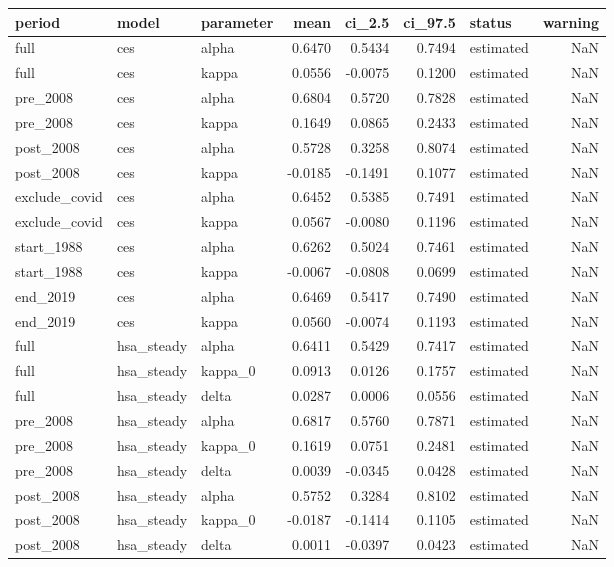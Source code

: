 \begin{tabular}{lllrrrlr}
\toprule
period & model & parameter & mean & ci\_2.5 & ci\_97.5 & status & warning \\
\midrule
full & ces & alpha & 0.6470 & 0.5434 & 0.7494 & estimated & NaN \\
full & ces & kappa & 0.0556 & -0.0075 & 0.1200 & estimated & NaN \\
pre\_2008 & ces & alpha & 0.6804 & 0.5720 & 0.7828 & estimated & NaN \\
pre\_2008 & ces & kappa & 0.1649 & 0.0865 & 0.2433 & estimated & NaN \\
post\_2008 & ces & alpha & 0.5728 & 0.3258 & 0.8074 & estimated & NaN \\
post\_2008 & ces & kappa & -0.0185 & -0.1491 & 0.1077 & estimated & NaN \\
exclude\_covid & ces & alpha & 0.6452 & 0.5385 & 0.7491 & estimated & NaN \\
exclude\_covid & ces & kappa & 0.0567 & -0.0080 & 0.1196 & estimated & NaN \\
start\_1988 & ces & alpha & 0.6262 & 0.5024 & 0.7461 & estimated & NaN \\
start\_1988 & ces & kappa & -0.0067 & -0.0808 & 0.0699 & estimated & NaN \\
end\_2019 & ces & alpha & 0.6469 & 0.5417 & 0.7490 & estimated & NaN \\
end\_2019 & ces & kappa & 0.0560 & -0.0074 & 0.1193 & estimated & NaN \\
full & hsa\_steady & alpha & 0.6411 & 0.5429 & 0.7417 & estimated & NaN \\
full & hsa\_steady & kappa\_0 & 0.0913 & 0.0126 & 0.1757 & estimated & NaN \\
full & hsa\_steady & delta & 0.0287 & 0.0006 & 0.0556 & estimated & NaN \\
pre\_2008 & hsa\_steady & alpha & 0.6817 & 0.5760 & 0.7871 & estimated & NaN \\
pre\_2008 & hsa\_steady & kappa\_0 & 0.1619 & 0.0751 & 0.2481 & estimated & NaN \\
pre\_2008 & hsa\_steady & delta & 0.0039 & -0.0345 & 0.0428 & estimated & NaN \\
post\_2008 & hsa\_steady & alpha & 0.5752 & 0.3284 & 0.8102 & estimated & NaN \\
post\_2008 & hsa\_steady & kappa\_0 & -0.0187 & -0.1414 & 0.1105 & estimated & NaN \\
post\_2008 & hsa\_steady & delta & 0.0011 & -0.0397 & 0.0423 & estimated & NaN \\

\end{tabular}
